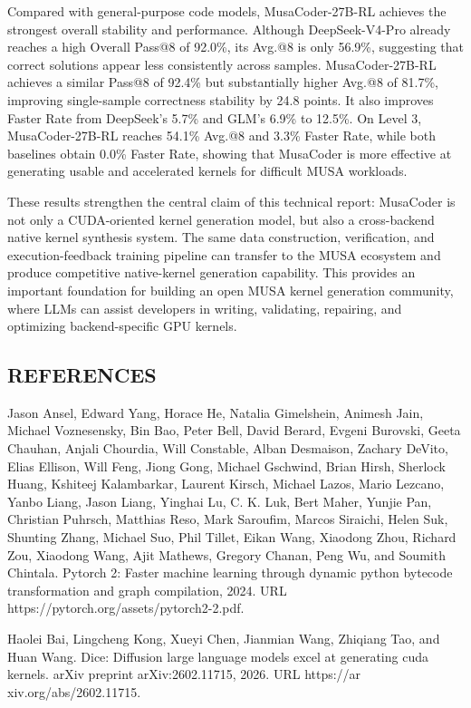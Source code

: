 \documentclass[
  10
]{article}
\begin{document}
Compared with general-purpose code models, MusaCoder-27B-RL achieves the
strongest overall stability and performance. Although DeepSeek-V4-Pro
already reaches a high Overall Pass@8 of 92.0\%, its Avg.@8 is only
56.9\%, suggesting that correct solutions appear less consistently
across samples. MusaCoder-27B-RL achieves a similar Pass@8 of 92.4\% but
substantially higher Avg.@8 of 81.7\%, improving single-sample
correctness stability by 24.8 points. It also improves Faster Rate from
DeepSeek's 5.7\% and GLM's 6.9\% to 12.5\%. On Level 3, MusaCoder-27B-RL
reaches 54.1\% Avg.@8 and 3.3\% Faster Rate, while both baselines obtain
0.0\% Faster Rate, showing that MusaCoder is more effective at
generating usable and accelerated kernels for difficult MUSA workloads.

These results strengthen the central claim of this technical report:
MusaCoder is not only a CUDA-oriented kernel generation model, but also
a cross-backend native kernel synthesis system. The same data
construction, verification, and execution-feedback training pipeline can
transfer to the MUSA ecosystem and produce competitive native-kernel
generation capability. This provides an important foundation for
building an open MUSA kernel generation community, where LLMs can assist
developers in writing, validating, repairing, and optimizing
backend-specific GPU kernels.

\subsection{REFERENCES}\label{references}

Jason Ansel, Edward Yang, Horace He, Natalia Gimelshein, Animesh Jain,
Michael Voznesensky, Bin Bao, Peter Bell, David Berard, Evgeni Burovski,
Geeta Chauhan, Anjali Chourdia, Will Constable, Alban Desmaison, Zachary
DeVito, Elias Ellison, Will Feng, Jiong Gong, Michael Gschwind, Brian
Hirsh, Sherlock Huang, Kshiteej Kalambarkar, Laurent Kirsch, Michael
Lazos, Mario Lezcano, Yanbo Liang, Jason Liang, Yinghai Lu, C. K. Luk,
Bert Maher, Yunjie Pan, Christian Puhrsch, Matthias Reso, Mark Saroufim,
Marcos Siraichi, Helen Suk, Shunting Zhang, Michael Suo, Phil Tillet,
Eikan Wang, Xiaodong Zhou, Richard Zou, Xiaodong Wang, Ajit Mathews,
Gregory Chanan, Peng Wu, and Soumith Chintala. Pytorch 2: Faster machine
learning through dynamic python bytecode transformation and graph
compilation, 2024. URL https://pytorch.org/assets/pytorch2-2.pdf.

Haolei Bai, Lingcheng Kong, Xueyi Chen, Jianmian Wang, Zhiqiang Tao, and
Huan Wang. Dice: Diffusion large language models excel at generating
cuda kernels. arXiv preprint arXiv:2602.11715, 2026. URL https://ar
xiv.org/abs/2602.11715.
\end{document}
